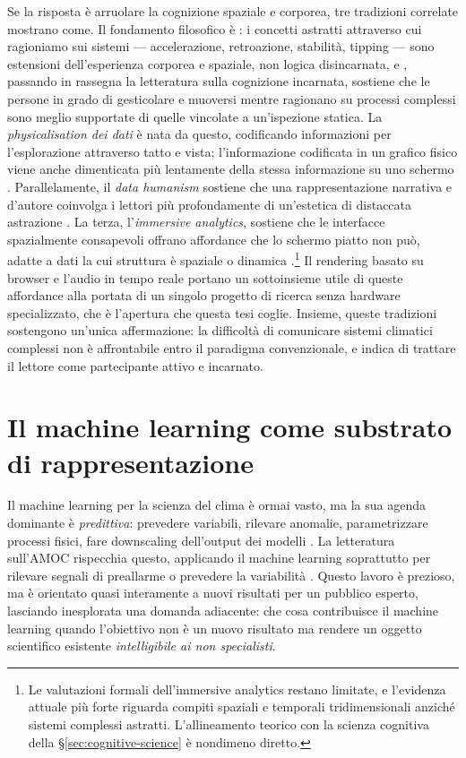 Se la risposta è arruolare la cognizione spaziale e corporea, tre tradizioni correlate mostrano come. Il fondamento filosofico è \citet{lakoff1999}: i concetti astratti attraverso cui ragioniamo sui sistemi --- accelerazione, retroazione, stabilità, tipping --- sono estensioni dell'esperienza corporea e spaziale, non logica disincarnata, e \citet{kirsh2013}, passando in rassegna la letteratura sulla cognizione incarnata, sostiene che le persone in grado di gesticolare e muoversi mentre ragionano su processi complessi sono meglio supportate di quelle vincolate a un'ispezione statica. La \emph{physicalisation dei dati} \citep{jansen2015} è nata da questo, codificando informazioni per l'esplorazione attraverso tatto e vista; l'informazione codificata in un grafico fisico viene anche dimenticata più lentamente della stessa informazione su uno schermo \parencite{stusak2015}. Parallelamente, il \emph{data humanism} sostiene che una rappresentazione narrativa e d'autore coinvolga i lettori più profondamente di un'estetica di distaccata astrazione \citep{lupi2017, segel2010}. La terza, l'\emph{immersive analytics}, sostiene che le interfacce spazialmente consapevoli offrano affordance che lo schermo piatto non può, adatte a dati la cui struttura è spaziale o dinamica \citep{marriott2018}.\footnote{Le valutazioni formali dell'immersive analytics restano limitate, e l'evidenza attuale più forte riguarda compiti spaziali e temporali tridimensionali anziché sistemi complessi astratti. L'allineamento teorico con la scienza cognitiva della \S\ref{sec:cognitive-science} è nondimeno diretto.} Il rendering basato su browser e l'audio in tempo reale portano un sottoinsieme utile di queste affordance alla portata di un singolo progetto di ricerca senza hardware specializzato, che è l'apertura che questa tesi coglie. Insieme, queste tradizioni sostengono un'unica affermazione: la difficoltà di comunicare sistemi climatici complessi non è affrontabile entro il paradigma convenzionale, e indica di trattare il lettore come partecipante attivo e incarnato.

\section{Il machine learning come substrato di rappresentazione}
\label{sec:ml-climate}

Il machine learning per la scienza del clima è ormai vasto, ma la sua agenda dominante è \emph{predittiva}: prevedere variabili, rilevare anomalie, parametrizzare processi fisici, fare downscaling dell'output dei modelli \citep{reichstein2019, sonnewald2021}. La letteratura sull'AMOC rispecchia questo, applicando il machine learning soprattutto per rilevare segnali di preallarme o prevedere la variabilità \citep{boers2021, ditlevsen2023}. Questo lavoro è prezioso, ma è orientato quasi interamente a nuovi risultati per un pubblico esperto, lasciando inesplorata una domanda adiacente: che cosa contribuisce il machine learning quando l'obiettivo non è un nuovo risultato ma rendere un oggetto scientifico esistente \emph{intelligibile ai non specialisti}.

